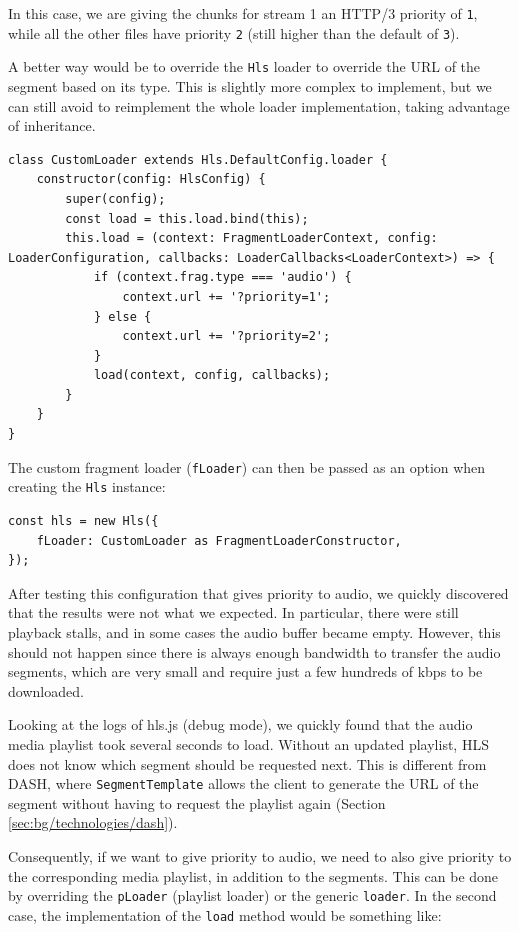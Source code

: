 In this case, we are giving the chunks for stream 1 an HTTP/3 priority of \texttt{1}, while all the other files have priority \texttt{2} (still higher than the default of \texttt{3}).

A better way would be to override the \texttt{Hls} loader to override the URL of the segment based on its type. This is slightly more complex to implement, but we can still avoid to reimplement the whole loader implementation, taking advantage of inheritance.

\begin{verbatim}
class CustomLoader extends Hls.DefaultConfig.loader {
    constructor(config: HlsConfig) {
        super(config);
        const load = this.load.bind(this);
        this.load = (context: FragmentLoaderContext, config: LoaderConfiguration, callbacks: LoaderCallbacks<LoaderContext>) => {
            if (context.frag.type === 'audio') {
                context.url += '?priority=1';
            } else {
                context.url += '?priority=2';
            }
            load(context, config, callbacks);
        }
    }
}
\end{verbatim}

The custom fragment loader (\texttt{fLoader}) can then be passed as an option when creating the \texttt{Hls} instance:

\begin{verbatim}
const hls = new Hls({
    fLoader: CustomLoader as FragmentLoaderConstructor,
});
\end{verbatim}

After testing this configuration that gives priority to audio, we quickly discovered that the results were not what we expected. In particular, there were still playback stalls, and in some cases the audio buffer became empty. However, this should not happen since there is always enough bandwidth to transfer the audio segments, which are very small and require just a few hundreds of kbps to be downloaded.

Looking at the logs of hls.js (debug mode), we quickly found that the audio media playlist took several seconds to load. Without an updated playlist, HLS does not know which segment should be requested next. This is different from DASH, where \texttt{SegmentTemplate} allows the client to generate the URL of the segment without having to request the playlist again (Section \ref{sec:bg/technologies/dash}).

Consequently, if we want to give priority to audio, we need to also give priority to the corresponding media playlist, in addition to the segments. This can be done by overriding the \texttt{pLoader} (playlist loader) or the generic \texttt{loader}. In the second case, the implementation of the \texttt{load} method would be something like:

